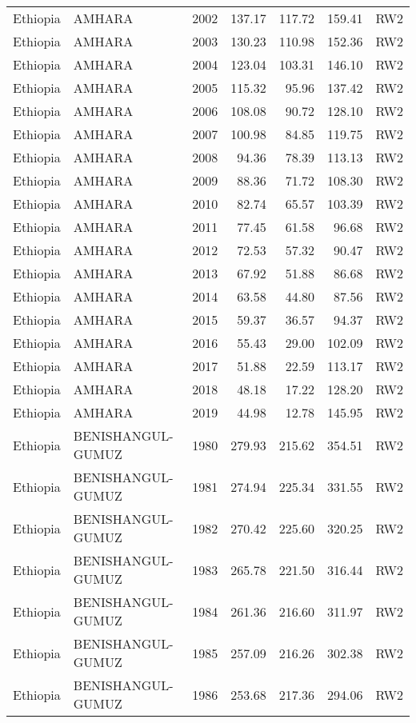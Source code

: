\begin{longtable}{lllrrrl}
  Ethiopia & AMHARA & 2002 & 137.17 & 117.72 & 159.41 & RW2 \\ 
  Ethiopia & AMHARA & 2003 & 130.23 & 110.98 & 152.36 & RW2 \\ 
  Ethiopia & AMHARA & 2004 & 123.04 & 103.31 & 146.10 & RW2 \\ 
  Ethiopia & AMHARA & 2005 & 115.32 & 95.96 & 137.42 & RW2 \\ 
  Ethiopia & AMHARA & 2006 & 108.08 & 90.72 & 128.10 & RW2 \\ 
  Ethiopia & AMHARA & 2007 & 100.98 & 84.85 & 119.75 & RW2 \\ 
  Ethiopia & AMHARA & 2008 & 94.36 & 78.39 & 113.13 & RW2 \\ 
  Ethiopia & AMHARA & 2009 & 88.36 & 71.72 & 108.30 & RW2 \\ 
  Ethiopia & AMHARA & 2010 & 82.74 & 65.57 & 103.39 & RW2 \\ 
  Ethiopia & AMHARA & 2011 & 77.45 & 61.58 & 96.68 & RW2 \\ 
  Ethiopia & AMHARA & 2012 & 72.53 & 57.32 & 90.47 & RW2 \\ 
  Ethiopia & AMHARA & 2013 & 67.92 & 51.88 & 86.68 & RW2 \\ 
  Ethiopia & AMHARA & 2014 & 63.58 & 44.80 & 87.56 & RW2 \\ 
  Ethiopia & AMHARA & 2015 & 59.37 & 36.57 & 94.37 & RW2 \\ 
  Ethiopia & AMHARA & 2016 & 55.43 & 29.00 & 102.09 & RW2 \\ 
  Ethiopia & AMHARA & 2017 & 51.88 & 22.59 & 113.17 & RW2 \\ 
  Ethiopia & AMHARA & 2018 & 48.18 & 17.22 & 128.20 & RW2 \\ 
  Ethiopia & AMHARA & 2019 & 44.98 & 12.78 & 145.95 & RW2 \\ 
  Ethiopia & BENISHANGUL-GUMUZ & 1980 & 279.93 & 215.62 & 354.51 & RW2 \\ 
  Ethiopia & BENISHANGUL-GUMUZ & 1981 & 274.94 & 225.34 & 331.55 & RW2 \\ 
  Ethiopia & BENISHANGUL-GUMUZ & 1982 & 270.42 & 225.60 & 320.25 & RW2 \\ 
  Ethiopia & BENISHANGUL-GUMUZ & 1983 & 265.78 & 221.50 & 316.44 & RW2 \\ 
  Ethiopia & BENISHANGUL-GUMUZ & 1984 & 261.36 & 216.60 & 311.97 & RW2 \\ 
  Ethiopia & BENISHANGUL-GUMUZ & 1985 & 257.09 & 216.26 & 302.38 & RW2 \\ 
  Ethiopia & BENISHANGUL-GUMUZ & 1986 & 253.68 & 217.36 & 294.06 & RW2 \\ 

\end{longtable}
